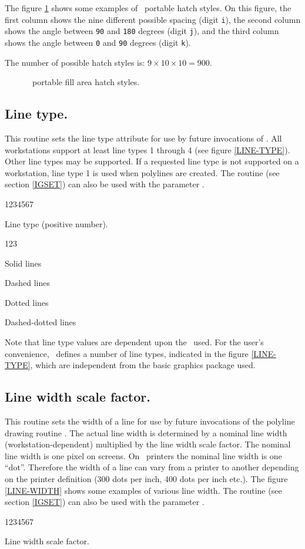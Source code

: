 The figure \ref{FILL-STY} shows some examples of \HIGZ~portable hatch styles.
On this figure, the first column shows the nine different possible spacing
(digit {\tt i}), the second column shows the angle between {\tt 90} and
{\tt 180} degrees (digit {\tt j}), and the third column shows the angle between
{\tt 0} and {\tt 90} degrees (digit {\tt k}).

The number of possible hatch styles is: $9\times10\times10=900$.
\begin{figure}[p]
\caption{\HIGZ~portable fill area hatch styles.}
\label{FILL-STY}
\end{figure}
\clearpage
%
\subsection{Line type.}
\Action
This routine sets the line type attribute for use by future invocations of
. All workstations support at least line types 1 through 4
(see figure \ref{LINE-TYPE}). Other line types may be supported. If a requested
line type is not supported on a workstation, line type 1 is used when polylines
are created.
The routine  (see section \ref{IGSET}) can also be used with the
parameter .
\Pdesc
\begin{DLtt}{1234567}
\item[LTYPE] Line type (positive number).
\begin{DLtt}{123}
\item[1] Solid lines
\item[2] Dashed lines
\item[3] Dotted lines
\item[4] Dashed-dotted lines
\end{DLtt}
\end{DLtt}
\par
Note that line type values are dependent upon the \UGP~used. For the user's
convenience, \HIGZ~defines a number of line types, indicated in the figure
\ref{LINE-TYPE}, which are independent from the basic graphics package used.
%
\subsection{Line width scale factor.}
\Action
This routine sets the width of a line for use by future invocations of the
polyline drawing routine . The actual line width is determined by a
nominal line width (workstation-dependent) multiplied by the line width scale
factor. The nominal line width is one pixel on screens. On \PS~printers the
nominal line width is one ``dot''. Therefore the width of a line can vary from
a printer to another depending on the printer definition (300 dots per inch,
400 dots per inch etc.). The figure \ref{LINE-WIDTH} shows some examples of
various line width. The routine  (see section \ref{IGSET}) can also
be used with the parameter .
\Pdesc
\begin{DLtt}{1234567}
\item[WIDTH] Line width scale factor.
\end{DLtt}

